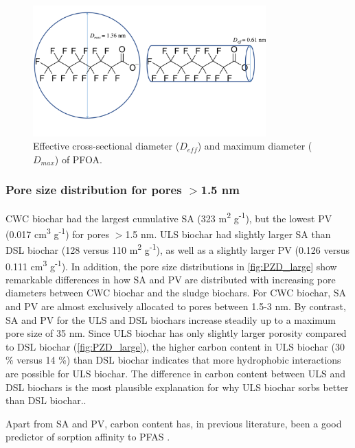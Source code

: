 \begin{figure}
    \centering
    \includegraphics[width=0.8\textwidth, trim={0 2cm 0 0},clip]{Diagrams/Molecular_size.pdf}
    \caption{Effective cross-sectional diameter ($D_{eff}$) and maximum diameter ($D_{max}$) of PFOA.}
    \label{fig:molecularSize}
\end{figure}

\subsubsection{Pore size distribution for pores $>$1.5 nm}
CWC biochar had the largest cumulative SA (323 m\textsuperscript{2} g\textsuperscript{-1}), but the lowest PV (0.017 cm\textsuperscript{3} g\textsuperscript{-1}) for pores $>$1.5 nm. ULS biochar had slightly larger SA than DSL biochar (128 versus 110 m\textsuperscript{2} g\textsuperscript{-1}), as well as a slightly larger PV (0.126 versus 0.111 cm\textsuperscript{3} g\textsuperscript{-1}). In addition, the pore size distributions in \cref{fig:PZD_large} show remarkable differences in how SA and PV are distributed with increasing pore diameters between CWC biochar and the sludge biochars. For CWC biochar, SA and PV are almost exclusively allocated to pores between 1.5-3 nm. By contrast, SA and PV for the ULS and DSL biochars increase steadily up to a maximum pore size of 35 nm. Since ULS biochar has only slightly larger porosity compared to DSL biochar (\cref{fig:PZD_large}), the higher carbon content in ULS biochar (30 \% versus 14 \%) than DSL biochar indicates that more hydrophobic interactions are possible for ULS biochar. The difference in carbon content between ULS and DSL biochars is the most plausible explanation for why ULS biochar sorbs better than DSL biochar.. 

Apart from SA and PV, carbon content has, in previous literature, been a good predictor of sorption affinity to PFAS \citep{Hale2016, Cornelissen2005}. 

